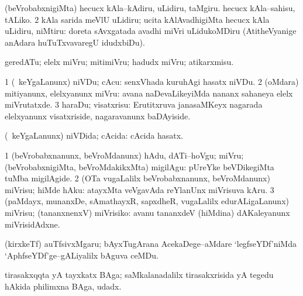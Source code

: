 \bentry
{}
\gl{\sakirx}
\bmng
\bnum
{} (beVrobabxnigiMta) 
\banum
{} hecucx kAla--kAdiru, uLidiru, taMgiru. 
 hecucx kAla--sahisu, tALiko. 
\eanum
\numie
\num{2} kAla sarida meVlU uLidiru; ucita kAlAvadhigiMta hecucx kAla uLidiru, niMtiru:  doreta sAvxgatada avadhi miVri uLidukoMDiru (AtitheVyanige anAdara huTuTxvavaregU idudxbiDu). 
\enum
\emng
\eentry

\bentry
{}
\gl{\sakirx}
\bmng
geredATu; elelx miVru; mitimiVru; hadudx miVru; atikarxmisu. 
\emng
\eentry

\bentry
{}
\gl{\sakirx}
\bmng
\bnum
\num{1} (\kanmu\ keYgaLanunx) niVDu; cAcu:  senxVhada kuruhAgi hasatx niVDu. 
\num{2} (oMdara) mitiyanunx, elelxyanunx miVru:  avana naDevaLikeyiMda nananx sahaneya elelx miVrutatxde. 
\num{3} haraDu; visatxrisu:  Erutitxruva janasaMKeyx nagarada elelxyanunx visatxriside, nagaravanunx baDAyiside. 
\enum
\emng
\eentry

\bentry
{}
\gl{\gu}
\bmng
(\kanmu\ keYgaLanunx) niVDida; cAcida:  cAcida hasatx. 
\emng
\eentry

\bentry
{}
\gl{\sakirx}
\bmng
\bnum
\num{1} (beVrobabxnanunx, beVroMdanunx) hAdu, dATi--hoVgu; miVru; (beVrobabxnigiMta, beVroMdakikxMta) migilAgu:  pUreYke beVDikegiMta tuMba migilAgide. 
\num{2} (OTa \mo vugaLalilx beVrobabxnanunx, beVroMdanunx) miVrisu; hiMde hAku:  atayxMta veVgavAda reYlanUnx miVrisuva kAru. 
\num{3} (paMdayx, munanxDe, sAmathayxR, sapxdheR, \mo vugaLalilx edurALigaLanunx) miVrisu; (tananxnenxV) miVrisiko:  avanu tananxdeV (hiMdina) dAKaleyanunx miVrisidAdxne. 
\enum
\emng
\eentry

\bentry
{}
\gl{\nA}
\bmng
(kirxkeTf) auTfsivxMgaru; bAyxTugArana AcekaDege--aMdare `legfseYDf'niMda `AphfseYDf'ge--gALiyalilx bAguva ceMDu. 
\emng
\eentry

\bentry
{}
\gl{\nA}
\bmng
tirasakxqqta yA tayxkatx BAga; saMkalanadalilx tirasakxrisida yA tegedu hAkida philimxna BAga, udadx. 
\emng
\eentry

